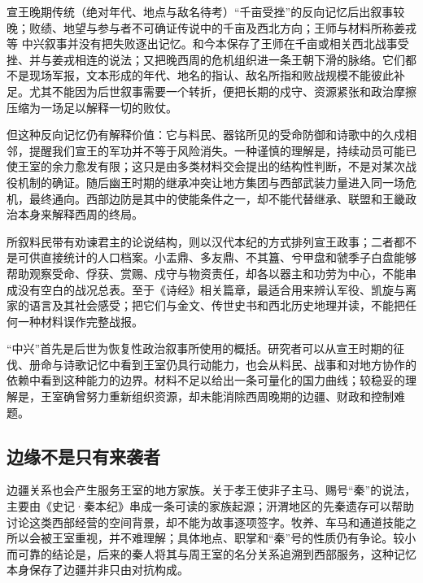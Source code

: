 \begin{event}{宣王晚期传统（绝对年代、地点与敌名待考）}{“千亩受挫”的反向记忆}{后出叙事较晚；败绩、地望与参与者不可确证}{传说中的千亩及西北方向；王师与材料所称姜戎等}
中兴叙事并没有把失败逐出记忆。和今本保存了王师在千亩或相关西北战事受挫、并与姜戎相连的说法；又把晚西周的危机组织进一条王朝下滑的脉络。它们都不是现场军报，文本形成的年代、地名的指认、敌名所指和败战规模不能彼此补足。尤其不能因为后世叙事需要一个转折，便把长期的戍守、资源紧张和政治摩擦压缩为一场足以解释一切的败仗。

但这种反向记忆仍有解释价值：它与料民、器铭所见的受命防御和诗歌中的久戍相邻，提醒我们宣王的军功并不等于风险消失。一种谨慎的理解是，持续动员可能已使王室的余力愈发有限；这只是由多类材料交会提出的结构性判断，不是对某次战役机制的确证。随后幽王时期的继承冲突让地方集团与西部武装力量进入同一场危机，最终通向。西部边防是其中的使能条件之一，却不能代替继承、联盟和王畿政治本身来解释西周的终局。
\end{event}

\begin{sourcenote}[料民、铭文与诗歌各能说明什么]
所叙料民带有劝谏君主的论说结构，则以汉代本纪的方式排列宣王政事；二者都不是可供直接统计的人口档案。小盂鼎、多友鼎、不其簋、兮甲盘和虢季子白盘能够帮助观察受命、俘获、赏赐、戍守与物资责任，却各以器主和功劳为中心，不能串成没有空白的战况总表。至于《诗经》相关篇章，最适合用来辨认军役、凯旋与离家的语言及其社会感受；把它们与金文、传世史书和西北历史地理并读，不能把任何一种材料误作完整战报。
\end{sourcenote}

\begin{debate}[“中兴”不是国家能力的温度计]
“中兴”首先是后世为恢复性政治叙事所使用的概括。研究者可以从宣王时期的征伐、册命与诗歌记忆中看到王室仍具行动能力，也会从料民、战事和对地方协作的依赖中看到这种能力的边界。材料不足以给出一条可量化的国力曲线；较稳妥的理解是，王室确曾努力重新组织资源，却未能消除西周晚期的边疆、财政和控制难题。
\end{debate}

\subsection{边缘不是只有来袭者}

边疆关系也会产生服务王室的地方家族。关于孝王使非子主马、赐号“秦”的说法，主要由《史记·秦本纪》串成一条可读的家族起源；汧渭地区的先秦遗存可以帮助讨论这类西部经营的空间背景，却不能为故事逐项签字。牧养、车马和通道技能之所以会被王室重视，并不难理解；具体地点、职掌和“秦”号的性质仍有争论。较小而可靠的结论是，后来的秦人将其与周王室的名分关系追溯到西部服务，这种记忆本身保存了边疆并非只由对抗构成。

